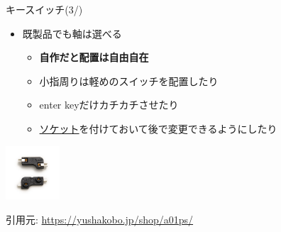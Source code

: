 \documentclass[cjk,dvipdfmx,10pt,compress,fragile%
hyperref={bookmarks=true,bookmarksnumbered=true,bookmarksopen=false,%
colorlinks=false,%
pdftitle={第 134 回 関西 Debian 勉強会},%
pdfauthor={小林},%
pdfsubject={資料},%
}]{beamer}
\begin{document}
\begin{frame}[fragile,t]{キースイッチ(3/)}
 \begin{itemize}
  \item 既製品でも軸は選べる
       \begin{itemize}
	\item \textbf{自作だと配置は自由自在}
	\item 小指周りは軽めのスイッチを配置したり
	\item enter keyだけカチカチさせたり
	\item \href{https://yushakobo.jp/shop/a01ps/}{ソケット}を付けておいて後で変更できるようにしたり
       \end{itemize}
 \end{itemize}
 \begin{center}
 \includegraphics[keepaspectratio,height=2cm]{./img/key-socket.jpg}
 \end{center}
 \begin{flushright}
  \footnotesize 引用元: \url{https://yushakobo.jp/shop/a01ps/}
 \end{flushright}
\end{frame}
\end{document}
